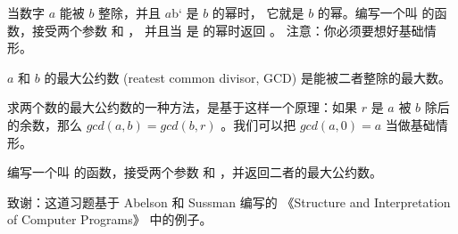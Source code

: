 \begin{exercise}


当数字 $a$ 能被  $b$ 整除，并且 $a$b` 是 $b$ 的幂时， 它就是 $b$ 的幂。编写一个叫  的函数，接受两个参数  和 ， 并且当  是  的幂时返回 。
注意：你必须要想好基础情形。

\end{exercise}

\begin{exercise}
  


$a$ 和 $b$ 的最大公约数 (reatest common divisor, GCD) 是能被二者整除的最大数。


求两个数的最大公约数的一种方法，是基于这样一个原理：如果 $r$ 是 $a$ 被 $b$ 除后的余数，那么  $gcd(a,b) = gcd(b, r)$ 。我们可以把 $gcd(a, 0) = a$ 当做基础情形。


编写一个叫  的函数，接受两个参数  和 ，并返回二者的最大公约数。


致谢：这道习题基于 Abelson 和 Sussman 编写的 《Structure and Interpretation of Computer Programs》 中的例子。

\end{exercise}
